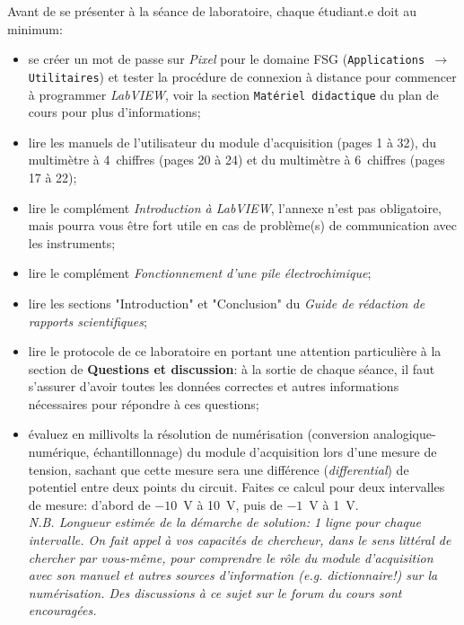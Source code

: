 \documentclass[canadien,12pt,oneside,letterpaper]{article}
\begin{document}
\noindent Avant de se présenter à la séance de laboratoire, chaque étudiant.e doit au minimum:
\vspace{1ex}
\begin{itemize} \itemsep5pt
\item se créer un mot de passe sur \textit{Pixel} pour le domaine FSG (\texttt{Applications $\rightarrow$ Utilitaires}) et tester la procédure de connexion à distance pour commencer à programmer \textit{LabVIEW}, voir la section \texttt{Matériel didactique} du plan de cours pour plus d'informations;
\item lire les manuels de l'utilisateur du module d'acquisition (pages 1 à 32), du multimètre à 4\textonehalf~chiffres (pages 20 à 24) et du multimètre à 6\textonehalf~chiffres (pages 17 à 22);
\item lire le complément \textit{Introduction à LabVIEW}, l'annexe n'est pas obligatoire, mais pourra vous être fort utile en cas de problème(s) de communication avec les instruments;
\item lire le complément \textit{Fonctionnement d'une pile électrochimique};
\item lire les sections "Introduction" et "Conclusion" du \textit{Guide de rédaction de rapports scientifiques};
\item lire le protocole de ce laboratoire en portant une attention particulière à la section de \textbf{Questions et discussion}: à la sortie de chaque séance, il faut s'assurer d'avoir toutes les données correctes et autres informations nécessaires pour répondre à ces questions;
\item évaluez en millivolts la résolution de numérisation (conversion analogique-numérique, échantillonnage) du module d'acquisition lors d'une mesure de tension, sachant que cette mesure sera une différence (\textit{differential}) de potentiel entre deux points du circuit. Faites ce calcul pour deux intervalles de mesure: d'abord de $-10$~V à 10~V, puis de $-1$~V à 1~V.\\ \textit{N.B. Longueur estimée de la démarche de solution: 1 ligne pour chaque intervalle. On fait appel à vos capacités de chercheur, dans le sens littéral de chercher par vous-même, pour comprendre le rôle du module d'acquisition avec son manuel et autres sources d'information (\textit{e.g.} dictionnaire!) sur la numérisation. Des discussions à ce sujet sur le forum du cours sont encouragées.}
\end{itemize}
%
\end{document}

